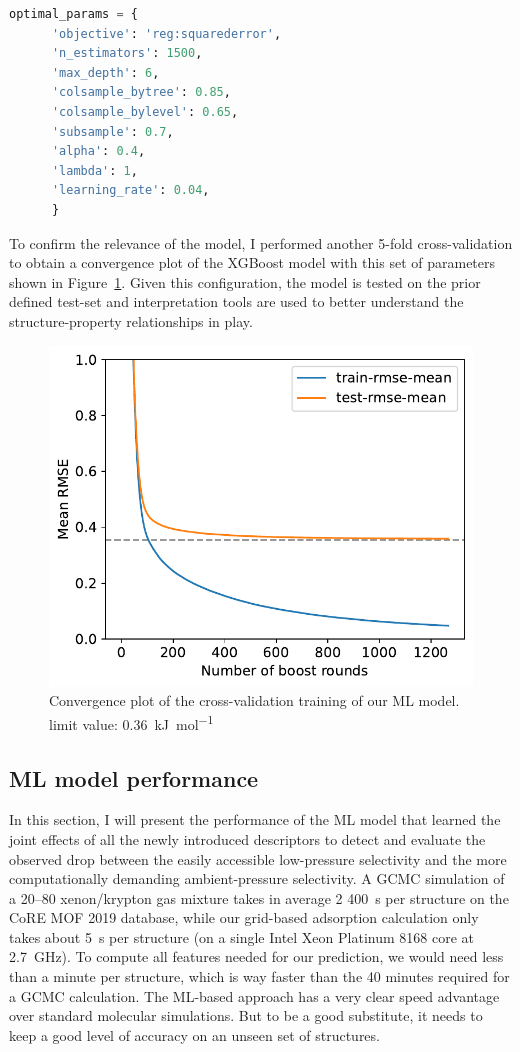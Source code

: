 \documentclass[main]{subfiles}
\begin{document}
\begin{lstlisting}[language=Python]
  optimal_params = {
      'objective': 'reg:squarederror',
      'n_estimators': 1500,
      'max_depth': 6,
      'colsample_bytree': 0.85,
      'colsample_bylevel': 0.65,
      'subsample': 0.7,
      'alpha': 0.4,
      'lambda': 1,
      'learning_rate': 0.04,
      }
  \end{lstlisting}

To confirm the relevance of the model, I performed another 5-fold cross-validation to obtain a convergence plot of the XGBoost model with this set of parameters shown in Figure~\ref{fgr:convplot}. Given this configuration, the model is tested on the prior defined test-set and interpretation tools are used to better understand the structure-property relationships in play.

\begin{figure}[ht]
  \centering
    \includegraphics[width=0.60\linewidth]{figures/4-ml/SI_figure/convergence_plot.pdf}
    \caption{Convergence plot of the cross-validation training of our ML model. limit value: 0.36~\si{\kilo\joule\per\mole}}\label{fgr:convplot}
  \end{figure}

\subsection{ML model performance}


In this section, I will present the performance of the ML model that learned the joint effects of all the newly introduced descriptors to detect and evaluate the observed drop between the easily accessible low-pressure selectivity and the more computationally demanding ambient-pressure selectivity.
A GCMC simulation of a 20–80 xenon/krypton gas mixture takes in average 2 400~\si{\second} per structure on the CoRE MOF 2019 database, while our grid-based adsorption calculation only takes about \SI{5}{\second} per structure (on a single Intel Xeon Platinum 8168 core at \SI{2.7}{\giga\hertz}). To compute all features needed for our prediction, we would need less than a minute per structure, which is way faster than the 40 minutes required for a GCMC calculation. The ML-based approach has a very clear speed advantage over standard molecular simulations. But to be a good substitute, it needs to keep a good level of accuracy on an unseen set of structures.
\end{document}
